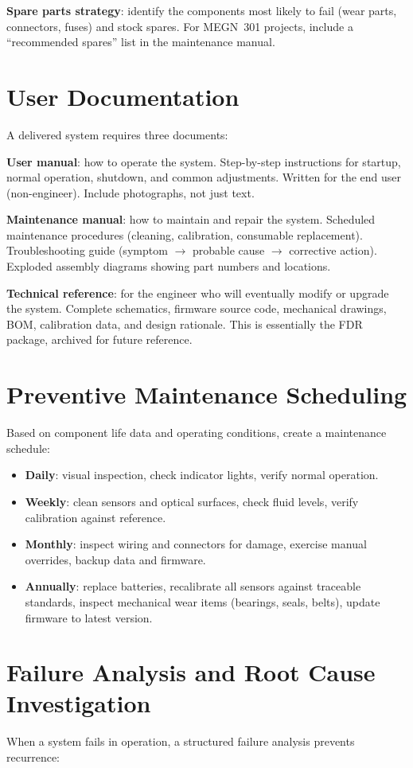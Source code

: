 \documentclass[11pt,letterpaper,twoside,openany]{book}
\begin{document}
\textbf{Spare parts strategy}: identify the components most likely to fail (wear parts, connectors, fuses) and stock spares. For MEGN~301 projects, include a ``recommended spares'' list in the maintenance manual.

\section{User Documentation}
A delivered system requires three documents:

\textbf{User manual}: how to operate the system. Step-by-step instructions for startup, normal operation, shutdown, and common adjustments. Written for the end user (non-engineer). Include photographs, not just text.

\textbf{Maintenance manual}: how to maintain and repair the system. Scheduled maintenance procedures (cleaning, calibration, consumable replacement). Troubleshooting guide (symptom $\to$ probable cause $\to$ corrective action). Exploded assembly diagrams showing part numbers and locations.

\textbf{Technical reference}: for the engineer who will eventually modify or upgrade the system. Complete schematics, firmware source code, mechanical drawings, BOM, calibration data, and design rationale. This is essentially the FDR package, archived for future reference.

\section{Preventive Maintenance Scheduling}
Based on component life data and operating conditions, create a maintenance schedule:

\begin{itemize}[nosep,leftmargin=1.5em]
\item \textbf{Daily}: visual inspection, check indicator lights, verify normal operation.
\item \textbf{Weekly}: clean sensors and optical surfaces, check fluid levels, verify calibration against reference.
\item \textbf{Monthly}: inspect wiring and connectors for damage, exercise manual overrides, backup data and firmware.
\item \textbf{Annually}: replace batteries, recalibrate all sensors against traceable standards, inspect mechanical wear items (bearings, seals, belts), update firmware to latest version.
\end{itemize}
\section{Failure Analysis and Root Cause Investigation}
When a system fails in operation, a structured failure analysis prevents recurrence:
\end{document}
